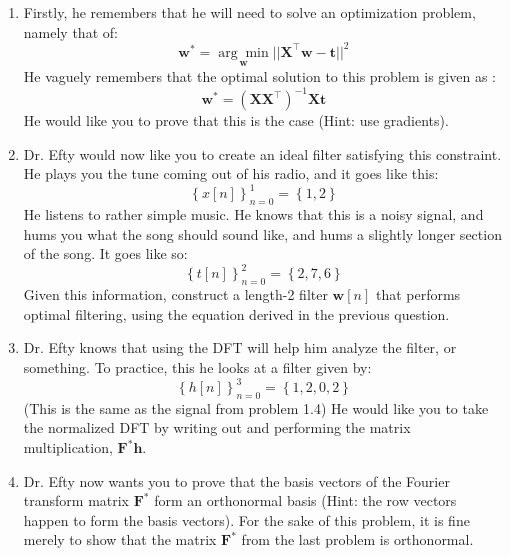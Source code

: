 \documentclass{article}
\begin{document}
\begin{enumerate}
    \item Firstly, he remembers that he will need to solve an optimization problem, namely that of:
    $$\boldsymbol{w^*} = \underset{\boldsymbol{w}}{\arg\min} ||\boldsymbol{X^\top w} - \boldsymbol{t}||^2$$
    He vaguely remembers that the optimal solution to this problem is given as :
    $$\boldsymbol{w^*} = (\boldsymbol{XX^\top})^{-1}\boldsymbol{Xt}$$
    He would like you to prove that this is the case (Hint: use gradients).
    \vspace{4cm}
    \item Dr. Efty would now like you to create an ideal filter satisfying this constraint. He plays you the tune coming out of his radio, and it goes like this:
    $$\left\{x[n]\right\}_{n=0}^{1} = \left\{ 1, 2 \right\}$$
    He listens to rather simple music. He knows that this is a noisy signal, and hums you what the song should sound like, and hums a slightly longer section of the song. It goes like so:
    $$\left\{t[n]\right\}_{n=0}^{2} = \left\{ 2, 7, 6 \right\}$$
    Given this information, construct a length-2 filter $\boldsymbol{w}[n]$ that performs optimal filtering, using the equation derived in the previous question.
    \newpage
    \item Dr. Efty knows that using the DFT will help him analyze the filter, or something. To practice, this he looks at a filter given by:
    $$\left\{h[n]\right\}_{n=0}^{3} = \left\{ 1, 2, 0, 2 \right\}$$
    (This is the same as the signal from problem 1.4) He would like you to take the normalized DFT by writing out and performing the matrix multiplication, $\boldsymbol{F^*h}$.
    
    \vspace{10cm}
    \item Dr. Efty now wants you to prove that the basis vectors of the Fourier transform matrix $\boldsymbol{F^*}$ form an orthonormal basis (Hint: the row vectors happen to form the basis vectors). For the sake of this problem, it is fine merely to show that the matrix $\boldsymbol{F^*}$ from the last problem is orthonormal.
\end{enumerate}
\end{document}
